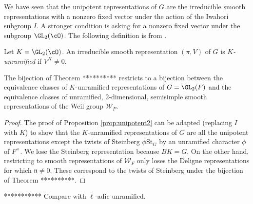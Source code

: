 We have seen that the unipotent representations of $G$ are the irreducible smooth representations with a nonzero fixed vector under the action of the Iwahori subgroup $I$. A stronger condition is asking for a nonzero fixed vector under the subgroup $\GL_2(\cO)$. The following definition is from \cite[Definition 7.1]{GH1}.

\begin{defn}
    Let $K=\GL_2(\cO)$. An irreducible smooth representation $(\pi,V)$ of $G$ is \textit{$K$-unramified} if $V^K \neq 0$.
\end{defn}

\begin{cor}
    The bijection of Theorem ********** restricts to a bijection between the equivalence classes of $K$-unramified representations of $G=\GL_2(F)$ and the equivalence classes of unramified, 2-dimensional, semisimple smooth representations of the Weil group $\mathcal W_F$.    
\end{cor}
\begin{proof}
    The proof of Proposition \ref{prop:unipotent2} can be adapted (replacing $I$ with $K$) to show that the $K$-unramified representations of $G$ are all the unipotent representations except the twists of Steinberg $\phi \mathrm{St}_G$ by an unramified character $\phi$ of $F^\times$. We lose the Steinberg representation because $BK=G$. On the other hand, restricting to smooth representations of $\mathcal W_F$ only loses the Deligne representations for which $\mathfrak n \neq 0$. These correspond to the twists of Steinberg under the bijection of Theorem **********.
\end{proof}
\begin{rem}
    *********** Compare with $\ell$-adic unramified.
\end{rem}



